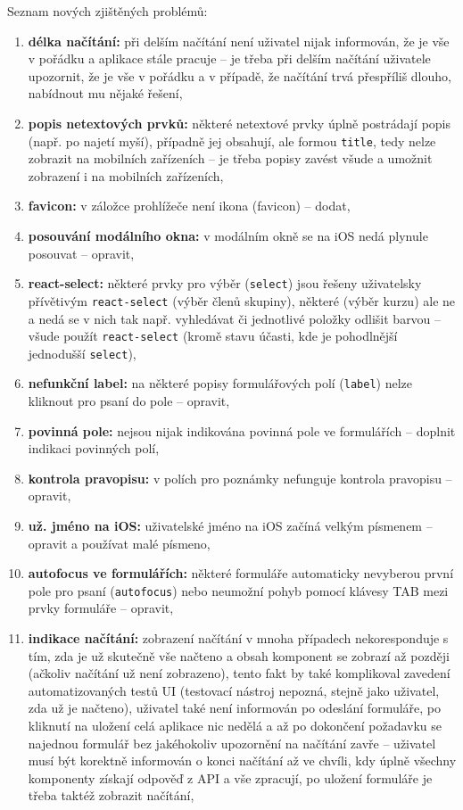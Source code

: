 Seznam nových zjištěných problémů:
\begin{enumerate}[label=\textbf{P\arabic*}]
    \item \label{P1} \textbf{délka načítání:} při delším načítání není uživatel nijak informován, že je vše v pořádku a aplikace stále pracuje -- je třeba při delším načítání uživatele upozornit, že je vše v pořádku a v případě, že načítání trvá přespříliš dlouho, nabídnout mu nějaké řešení,
    \item \label{P2} \textbf{popis netextových prvků:} některé netextové prvky úplně postrádají popis (např. po najetí myší), případně jej obsahují, ale formou \verb|title|, tedy nelze zobrazit na mobilních zařízeních -- je třeba popisy zavést všude a umožnit zobrazení i na mobilních zařízeních,
    \item \label{P3} \textbf{favicon:} v záložce prohlížeče není ikona (favicon) -- dodat,
    \item \label{P4} \textbf{posouvání modálního okna:} v modálním okně se na iOS nedá plynule posouvat -- opravit,
    \item \label{P5} \textbf{react-select:} některé prvky pro výběr (\verb|select|) jsou řešeny uživatelsky přívětivým \verb|react-select| (výběr členů skupiny), některé (výběr kurzu) ale ne a nedá se v nich tak např. vyhledávat či jednotlivé položky odlišit barvou -- všude použít \verb|react-select| (kromě stavu účasti, kde je pohodlnější jednodušší \verb|select|),
    \item \label{P6} \textbf{nefunkční label:} na některé popisy formulářových polí (\verb|label|) nelze kliknout pro psaní do pole -- opravit,
    \item \label{P7} \textbf{povinná pole:} nejsou nijak indikována povinná pole ve formulářích -- doplnit indikaci povinných polí,
    \item \label{P8} \textbf{kontrola pravopisu:} v polích pro poznámky nefunguje kontrola pravopisu -- opravit,
    \item \label{P9} \textbf{už. jméno na iOS:} uživatelské jméno na iOS začíná velkým písmenem -- opravit a používat malé písmeno,
    \item \label{P10} \textbf{autofocus ve formulářích:} některé formuláře automaticky nevyberou první pole pro psaní (\verb|autofocus|) nebo neumožní pohyb pomocí klávesy TAB mezi prvky formuláře -- opravit,
    \item \label{P11} \textbf{indikace načítání:} zobrazení načítání v mnoha případech nekoresponduje s tím, zda je už skutečně vše načteno a obsah komponent se zobrazí až později (ačkoliv načítání už není zobrazeno), tento fakt by také komplikoval zavedení automatizovaných testů UI (testovací nástroj nepozná, stejně jako uživatel, zda už je načteno), uživatel také není informován po odeslání formuláře, po kliknutí na uložení celá aplikace nic nedělá a až po dokončení požadavku se najednou formulář bez jakéhokoliv upozornění na načítání zavře -- uživatel musí být korektně informován o konci načítání až ve chvíli, kdy úplně všechny komponenty získají odpověď z API a vše zpracují, po uložení formuláře je třeba taktéž zobrazit načítání,

\end{enumerate}
